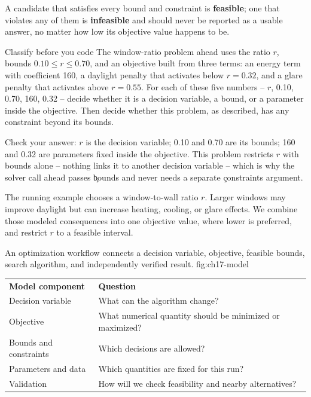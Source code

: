 A candidate that satisfies every bound and constraint is \textbf{feasible}; one
that violates any of them is \textbf{infeasible} and should never be reported as
a usable answer, no matter how low its objective value happens to be.

\begin{TryBox}{Classify before you code}
The window-ratio problem ahead uses the ratio $r$, bounds
$0.10 \le r \le 0.70$, and an objective built from three terms: an energy term
with coefficient 160, a daylight penalty that activates below $r = 0.32$, and a
glare penalty that activates above $r = 0.55$. For each of these five numbers
-- $r$, 0.10, 0.70, 160, 0.32 -- decide whether it is a decision variable, a
bound, or a parameter inside the objective. Then decide whether this problem,
as described, has any constraint beyond its bounds.
\end{TryBox}

Check your answer: $r$ is the decision variable; 0.10 and 0.70 are its bounds;
160 and 0.32 are parameters fixed inside the objective. This problem restricts
$r$ with bounds alone -- nothing links it to another decision variable -- which
is why the solver call ahead passes \c{bounds} and never needs a separate
\c{constraints} argument.


The running example chooses a window-to-wall ratio $r$. Larger windows may
improve daylight but can increase heating, cooling, or glare effects. We combine
those modeled consequences into one objective value, where lower is preferred,
and restrict $r$ to a feasible interval.

{An optimization workflow connects a decision variable, objective, feasible bounds, search algorithm, and independently verified result.}
{fig:ch17-model}

\begin{center}
\begin{tabular}{ll}
\textbf{Model component} & \textbf{Question} \\
Decision variable & What can the algorithm change? \\
Objective & What numerical quantity should be minimized or maximized? \\
Bounds and constraints & Which decisions are allowed? \\
Parameters and data & Which quantities are fixed for this run? \\
Validation & How will we check feasibility and nearby alternatives? \\
\end{tabular}
\end{center}

